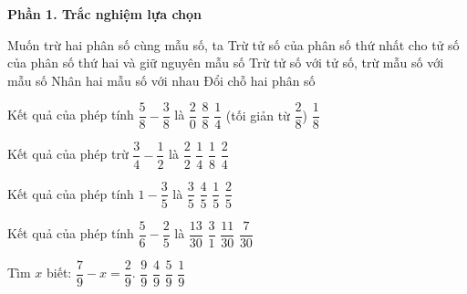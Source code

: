 \textbf{Phần 1. Trắc nghiệm lựa chọn}

\begin{ex} %
Muốn trừ hai phân số cùng mẫu số, ta
\choice
{\True Trừ tử số của phân số thứ nhất cho tử số của phân số thứ hai và giữ nguyên mẫu số}
{Trừ tử số với tử số, trừ mẫu số với mẫu số}
{Nhân hai mẫu số với nhau}
{Đổi chỗ hai phân số}
\end{ex}

\begin{ex} %
Kết quả của phép tính $\dfrac{5}{8} - \dfrac{3}{8}$ là
\choice
{$\dfrac{2}{0}$}
{$\dfrac{8}{8}$}
{\True $\dfrac{1}{4}$ (tối giản từ $\dfrac{2}{8}$)}
{$\dfrac{1}{8}$}
\end{ex}

\begin{ex} %
Kết quả của phép trừ $\dfrac{3}{4} - \dfrac{1}{2}$ là
\choice
{$\dfrac{2}{2}$}
{\True $\dfrac{1}{4}$}
{$\dfrac{1}{8}$}
{$\dfrac{2}{4}$}
\end{ex}

\begin{ex} %
Kết quả của phép tính $1 - \dfrac{3}{5}$ là
\choice
{$\dfrac{3}{5}$}
{$\dfrac{4}{5}$}
{$\dfrac{1}{5}$}
{\True $\dfrac{2}{5}$}
\end{ex}

\begin{ex} %
Kết quả của phép tính $\dfrac{5}{6} - \dfrac{2}{5}$ là
\choice
{\True $\dfrac{13}{30}$}
{$\dfrac{3}{1}$}
{$\dfrac{11}{30}$}
{$\dfrac{7}{30}$}
\end{ex}

\begin{ex} %
Tìm $x$ biết: $\dfrac{7}{9} - x = \dfrac{2}{9}$.
\choice
{$\dfrac{9}{9}$}
{$\dfrac{4}{9}$}
{\True $\dfrac{5}{9}$}
{$\dfrac{1}{9}$}
\end{ex}

